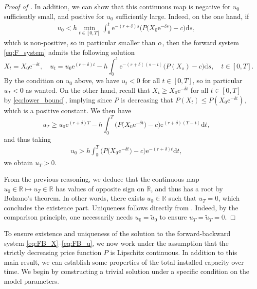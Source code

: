 \documentclass[12pt]{article}
\def \R{\mathbb{R}}
\def\erm{\mathrm{e}}
\def\drm{\mathrm{d}}
\begin{document}
\begin{proof}[Proof of ]
In addition, we can show that this continuous map is negative for $u_0$ sufficiently small, and positive for $u_0$ sufficiently large. Indeed, on the one hand, if
\begin{align*}
    u_0 < h \min_{t\in[0,T]} \int_{0}^{t} \erm^{-(r+\delta)s} \big(P \big(X_0\erm^{-\delta s} \big)-c \big)  \drm s, 
\end{align*}
which is non-positive, so in particular smaller than $\alpha$, then the forward system \eqref{eq:F_system} admits the following solution 
\begin{equation*}
X_t=X_0 \erm^{-\delta t}, \quad u_t=u_0 \erm^{(r+\delta)t}-h\int_{0}^{t} \erm^{-(r+\delta)(s-t)} \big( P(X_s)-c \big) \drm s, \quad t \in [0,T].
\end{equation*}
By the condition on $u_0$ above, we have $u_t <0$ for all $t \in [0,T]$, so in particular $u_T<0$ as wanted. On the other hand, recall that $X_t \geq X_0 \erm^{-\delta t}$ for all $t \in [0,T]$ by \eqref{eq:lower_bound}, implying since $P$ is decreasing that $P(X_t)\leq P(X_0 \erm^{-\delta t})$, which is a positive constant. We then have
\begin{equation*}
u_T\geq u_0 \erm^{(r+\delta)T}-h\int_{0}^{T} \big( P\big(X_0 \erm^{-\delta t}\big)-c \big) \erm^{(r+\delta)(T-t)} \drm t,
\end{equation*}
and thus taking
\begin{align*}
    u_0 > h \int_{0}^{T} \big( P\big(X_0 \erm^{-\delta t}\big)-c \big) \erm^{-(r+\delta)t} \drm t,
\end{align*}
we obtain $u_T>0$. 

From the previous reasoning, we deduce that the continuous map $u_0 \in \R \longmapsto u_T \in \R$ has values of opposite sign on $\R$, and thus has a root by Bolzano's theorem. In other words, there exists $u_0 \in \R$ such that $u_T=0$, which concludes the existence part. Uniqueness follows directly from . Indeed, by the comparison principle, one necessarily needs $u_0 = \tilde u_0$ to ensure $u_T = \tilde u_T = 0$.
\end{proof}

To ensure existence and uniqueness of the solution to the forward-backward system \eqref{eq:FB_X}--\eqref{eq:FB_u}, we now work under the assumption that the strictly decreasing price function $P$ is Lipschitz continuous.
In addition to this main result, we can establish some properties of the total installed capacity over time. We begin by constructing a trivial solution under a specific condition on the model parameters.
\end{document}

